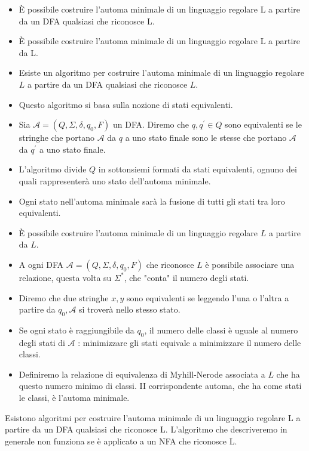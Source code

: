 \vspace{5mm}
\begin{itemize}
    \item È possibile costruire l'automa minimale di un linguaggio
regolare L a partire da un DFA qualsiasi che riconosce L.
    \item È possibile costruire l'automa minimale di un linguaggio
regolare L a partire da L.
    \item Esiste un algoritmo per costruire l'automa minimale di un linguaggio regolare $L$ a partire da un DFA qualsiasi che riconosce $L$.
    \item Questo algoritmo si basa sulla nozione di stati equivalenti.
    \item Sia $\mathcal{A}=\left(Q, \Sigma, \delta, q_{0}, F\right)$ un DFA. Diremo che $q, q^{\prime} \in Q$ sono equivalenti se le stringhe che portano $\mathcal{A}$ da $q$ a uno stato finale sono le stesse che portano $\mathcal{A}$ da $q^{\prime}$ a uno stato finale.
    \item L'algoritmo divide $Q$ in sottonsiemi formati da stati equivalenti, ognuno dei quali rappresenterà uno stato dell'automa minimale.
    \item Ogni stato nell'automa minimale sarà la fusione di tutti gli stati tra loro equivalenti.
    \item È possibile costruire l'automa minimale di un linguaggio regolare $L$ a partire da $L$.
    \item A ogni DFA $\mathcal{A}=\left(Q, \Sigma, \delta, q_{0}, F\right)$ che riconosce $L$ è possibile associare una relazione, questa volta su $\Sigma^{*}$, che "conta" il numero degli stati.
    \item Diremo che due stringhe $x, y$ sono equivalenti se leggendo l'una o l'altra a partire da $q_{0}, \mathcal{A}$ si troverà nello stesso stato.
    \item Se ogni stato è raggiungibile da $q_{0}$, il numero delle classi è uguale al numero degli stati di $\mathcal{A}$ : minimizzare gli stati equivale a minimizzare il numero delle classi.
    \item Definiremo la relazione di equivalenza di Myhill-Nerode associata a $L$ che ha questo numero minimo di classi. II corrispondente automa, che ha come stati le classi, è l'automa minimale.
\end{itemize}

Esistono algoritmi per costruire l'automa minimale di un
linguaggio regolare L a partire da un DFA qualsiasi che
riconosce L. L'algoritmo che descriveremo in generale non funziona se è
applicato a un NFA che riconosce L.

